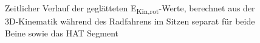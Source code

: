 \documentclass[
  letterpaper,
  DIV=11]{scrartcl}
\begin{document}
\begin{figure}


\caption{\label{fig-PInt_Kinematik_HAT_Ekin_rot_sitzen}Zeitlicher
Verlauf der geglätteten E\textsubscript{Kin,rot}-Werte, berechnet aus
der 3D-Kinematik während des Radfahrens im Sitzen separat für beide
Beine sowie das HAT Segment}

\end{figure}%
\end{document}
